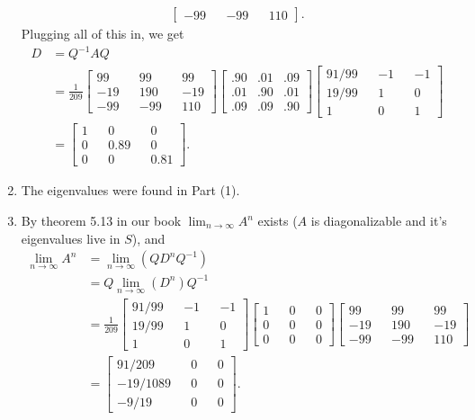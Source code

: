 \documentclass[10pt,a4paper]{article}
\theoremstyle{definition}
\begin{document}
\begin{enumerate}
\begin{align*}
\begin{bmatrix}
-99 && -99 && 110
\end{bmatrix}.
\end{align*}
Plugging all of this in, we get
\begin{align*}
D &= Q^{-1} A Q\\
&= \frac{1}{209} \begin{bmatrix}
99 && 99 && 99\\
-19 && 190 && -19\\
-99 && -99 && 110
\end{bmatrix} \begin{bmatrix}
.90 &.01 &.09\\
.01 &.90 &.01\\
.09 &.09 &.90
\end{bmatrix} \begin{bmatrix}
91/99 && -1 && -1\\
19/99 && 1 && 0\\
1 && 0 && 1
\end{bmatrix}\\
&= \begin{bmatrix}
1 && 0 && 0\\
0 && 0.89 && 0\\
0 && 0 && 0.81
\end{bmatrix}.
\end{align*}

\item The eigenvalues were found in Part (1).

\item By theorem 5.13 in our book $\lim_{n \to \infty} A^{n}$ exists ($A$ is diagonalizable and it's eigenvalues live in $S$), and
\begin{align*}
\lim_{n \to \infty} A^{n} &= \lim_{n \to \infty} (Q D^n Q^{-1})\\
&= Q \lim_{n \to \infty} (D^n) Q^{-1}\\
&= \frac{1}{209} \begin{bmatrix}
91/99 && -1 && -1\\
19/99 && 1 && 0\\
1 && 0 && 1
\end{bmatrix} \begin{bmatrix}
1 && 0 && 0\\
0 && 0 && 0\\
0 && 0 && 0
\end{bmatrix} \begin{bmatrix}
99 && 99 && 99\\
-19 && 190 && -19\\
-99 && -99 && 110
\end{bmatrix}\\
&= \begin{bmatrix}
91/209 && 0 && 0\\
-19/1089 && 0 && 0\\
-9/19 && 0 && 0
\end{bmatrix}.
\end{align*}


\end{enumerate}
\end{document}
